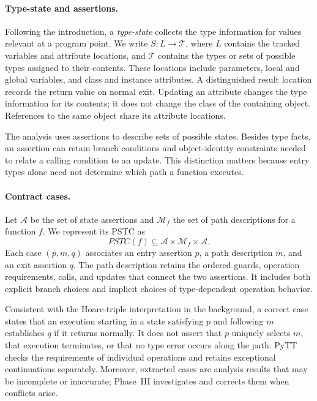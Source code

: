 \paragraph{Type-state and assertions.}
Following the introduction, a \emph{type-state} collects the type
information for values relevant at a program point. We write
$S:L\rightarrow\mathcal{T}$, where $L$ contains the tracked variables and
attribute locations, and $\mathcal{T}$ contains the types or sets of possible
types assigned to their contents. These locations include parameters,
local and global variables, and class and instance attributes. A
distinguished result location records the return value on normal exit.
Updating an attribute changes the type information for its contents; it
does not change the class of the containing object. References to the same
object share its attribute locations.

The analysis uses assertions to describe sets of possible states. Besides
type facts, an assertion can retain branch conditions and object-identity
constraints needed to relate a calling condition to an update. This
distinction matters because entry types alone need not determine which
path a function executes.

\paragraph{Contract cases.}
Let $\mathcal{A}$ be the set of state assertions and $\mathcal{M}_f$ the
set of path descriptions for a function $f$. We represent its PSTC as
\[
    \mathit{PSTC}(f) \subseteq
    \mathcal{A}\times\mathcal{M}_f\times\mathcal{A}.
\]
Each case $(p,m,q)$ associates an entry assertion $p$, a path description
$m$, and an exit assertion $q$. The path description retains the ordered
guards, operation requirements, calls, and updates that connect the two
assertions. It includes both explicit branch choices and implicit choices
of type-dependent operation behavior.

Consistent with the Hoare-triple interpretation in the background, a
correct case states that an execution starting in a state satisfying $p$
and following $m$ establishes $q$ if it returns normally. It does not
assert that $p$ uniquely selects $m$, that execution terminates, or that
no type error occurs along the path. PyTT checks the requirements of
individual operations and retains exceptional continuations separately.
Moreover, extracted cases are analysis results that may be incomplete or
inaccurate; Phase~III investigates and corrects them when conflicts arise.

